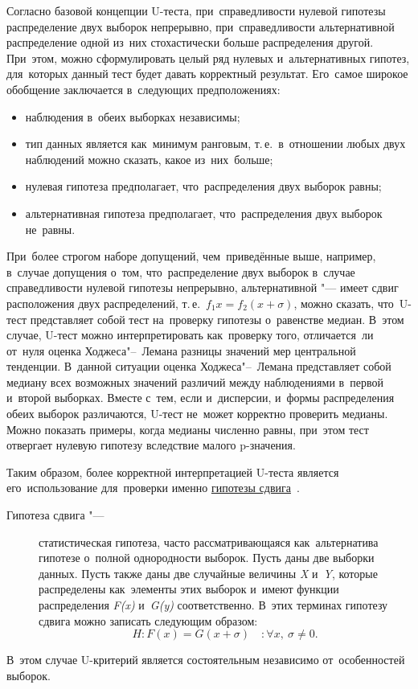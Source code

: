 \documentclass[]{scrreprt}
\begin{document}
Согласно базовой концепции U-теста, при~справедливости нулевой гипотезы распределение двух выборок непрерывно, при~справедливости альтернативной распределение одной из~них стохастически больше распределения другой. При~этом, можно сформулировать целый ряд нулевых и~альтернативных гипотез, для~которых данный тест будет давать корректный результат. Его~самое широкое обобщение заключается в~следующих предположениях:
\begin{itemize}
	\item наблюдения в~обеих выборках независимы;
	\item тип данных является как~минимум ранговым, т.\,е.~в~отношении любых двух наблюдений можно сказать, какое из~них~больше;
	\item нулевая гипотеза предполагает, что~распределения двух выборок равны;
	\item альтернативная гипотеза предполагает, что~распределения двух выборок не~равны.
\end{itemize}
При~более строгом наборе допущений, чем~приведённые выше, например, в~случае допущения о~том, что~распределение двух выборок в~случае справедливости нулевой гипотезы непрерывно, альтернативной "--- имеет сдвиг расположения двух распределений, т.\,е.~$f_{1}{x}=f_{2}(x+\sigma)$, можно сказать, что~U-тест представляет собой тест на~проверку гипотезы о~равенстве медиан. В~этом случае, U-тест можно интерпретировать как~проверку того, отличается~ли от~нуля оценка Ходжеса"--~Лемана разницы значений мер центральной тенденции. В~данной ситуации оценка Ходжеса"--~Лемана представляет собой медиану всех возможных значений различий между наблюдениями в~первой и~второй выборках. Вместе с~тем, если и~дисперсии, и~формы распределения обеих выборок различаются, U-тест не~может корректно проверить медианы. Можно показать примеры, когда медианы численно равны, при~этом тест отвергает нулевую гипотезу вследствие малого p-значения.

Таким образом, более корректной интерпретацией U-теста является его~использование для~проверки именно \href{http://www.machinelearning.ru/wiki/index.php?title=Гипотеза_сдвига}{гипотезы сдвига}~\cite{MLRU:shift-hypothesis}.
\begin{description}
	\item[Гипотеза сдвига "---] статистическая гипотеза, часто рассматривающаяся как~альтернатива гипотезе о~полной однородности выборок. Пусть даны две выборки данных. Пусть также даны две случайные величины \textit{X} и~\textit{Y}, которые распределены как~элементы этих выборок и~имеют функции распределения \textit{F(x)} и~\textit{G(y)} соответственно. В~этих терминах гипотезу сдвига можно записать следующим образом: 
	\begin{equation}
		H:F(x)=G(x+\sigma) \quad: \forall x,\ \sigma \neq 0.
	\end{equation}
\end{description}
В~этом случае U-критерий является состоятельным независимо от~особенностей выборок.
\end{document}
